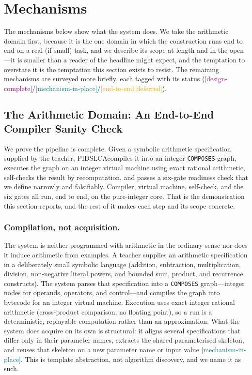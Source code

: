 \documentclass[11pt,a4paper]{article}
\newcommand{\statusdesign}{\textcolor{purple}{\small\textsf{[design-complete]}}}
\newcommand{\statusmech}{\textcolor{teal}{\small\textsf{[mechanism-in-place]}}}
\newcommand{\statusdeferred}{\textcolor{orange}{\small\textsf{[end-to-end deferred]}}}
\newcommand{\sysname}{PIDSLCA}
\begin{document}
\section{Mechanisms}
\label{sec:mechanisms}

The mechanisms below show what the system does. We take the arithmetic
domain first, because it is the one domain in which the construction
runs end to end on a real (if small) task, and we describe its scope at
length and in the open---it is smaller than a reader of the headline
might expect, and the temptation to overstate it is the temptation this
section exists to resist. The remaining mechanisms are surveyed more
briefly, each tagged with its status (\statusdesign/\statusmech/\statusdeferred).

\subsection{The Arithmetic Domain: An End-to-End Compiler Sanity Check}
\label{sec:mech-arith}

We prove the pipeline is complete. Given a symbolic arithmetic
specification supplied by the teacher, \sysname compiles it into an
integer \texttt{COMPOSES} graph, executes the graph on an integer
virtual machine using exact rational arithmetic, self-checks the result
by recomputation, and passes a six-gate readiness check that we define
narrowly and falsifiably. Compiler, virtual machine, self-check, and the
six gates all run, end to end, on the pure-integer core. That is the
demonstration this section reports, and the rest of it makes each step
and its scope concrete.

\subsubsection*{Compilation, not acquisition.}
The system is neither programmed with arithmetic in the ordinary sense
nor does it induce arithmetic from examples. A teacher supplies an
arithmetic specification in a deliberately small symbolic language
(addition, subtraction, multiplication, division, non-negative literal
powers, and bounded sum, product, and recurrence constructs). The system
parses that specification into a \texttt{COMPOSES} graph---integer nodes
for operands, operators, and control---and compiles the graph into
bytecode for an integer virtual machine. Execution uses exact integer
rational arithmetic (cross-product comparison, no floating point), so a
run is a deterministic, replayable computation rather than an
approximation. What the system does acquire on its own is structural: it
aligns several specifications that differ only in their parameter names,
extracts the shared parameterised skeleton, and reuses that skeleton on a
new parameter name or input value \statusmech. This is template
abstraction, not algorithm discovery, and we name it as such.
\end{document}
